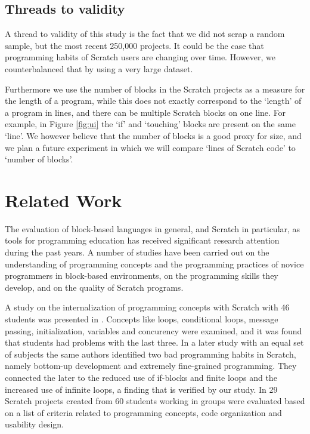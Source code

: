 \documentclass{sig-alternate}
\begin{document}
\subsection{Threads to validity}
A thread to validity of this study is the fact that we did not scrap a random sample, but the most recent 250,000 projects. It could be the case that programming habits of Scratch users are changing over time. However, we counterbalanced that by using a very large dataset.

Furthermore we use the number of blocks in the Scratch projects as a measure for the length of a program, while this does not exactly correspond to the `length' of a program in lines, and there can be multiple Scratch blocks on one line. For example, in Figure \ref{fig:ui} the `if' and `touching' blocks are present on the same `line'. We however believe that the number of blocks is a good proxy for size, and we plan a future experiment in which we will compare `lines of Scratch code' to `number of blocks'.


\section{Related Work}
\label{sec:related}

The evaluation of block-based languages in general, and Scratch in particular, as tools for programming education has received significant research attention during the past years. A number of studies have been carried out on the understanding of programming concepts and the programming practices of novice programmers in block-based environments, on the programming skills they develop, and on the quality of Scratch programs.

A study on the internalization of programming concepts with Scratch with 46 students was presented in \cite{meerbaum-salant_learning_2010}. Concepts like loops, conditional loops, message passing, initialization, variables and concurency were examined, and it was found that students had problems with the last three. In a later study with an equal set of subjects \cite{Meerbaum_habits_2011} the same authors identified two bad programming habits in Scratch, namely bottom-up development and extremely fine-grained programming. They connected the later to the reduced use of if-blocks and finite loops and the increased use of infinite loops, a finding that is verified by our study. In \cite{wilson_evaluation_2012} 29 Scratch projects created from 60 students working in groups were evaluated based on a list of criteria related to programming concepts, code organization and usability design.
\end{document}
